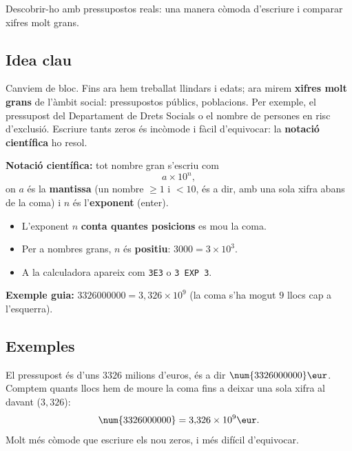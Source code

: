 %
{Descobrir-ho amb pressupostos reals: una manera còmoda d'escriure i comparar xifres molt grans.}

\subsection{Idea clau}

Canviem de bloc. Fins ara hem treballat llindars i edats; ara mirem
\textbf{xifres molt grans} de l'àmbit social: pressupostos públics, poblacions. Per
exemple, el pressupost del Departament de Drets Socials o el nombre de persones en
risc d'exclusió. Escriure tants zeros és incòmode i fàcil d'equivocar: la
\textbf{notació científica} ho resol.

\begin{idea}
\textbf{Notació científica:} tot nombre gran s'escriu com
\[
a\times 10^{n},
\]
on $a$ és la \textbf{mantissa} (un nombre $\ge 1$ i $<10$, és a dir, amb una sola
xifra abans de la coma) i $n$ és l'\textbf{exponent} (enter).
\begin{itemize}[leftmargin=1.4em, itemsep=2pt]
  \item L'exponent $n$ \textbf{conta quantes posicions} es mou la coma.
  \item Per a nombres grans, $n$ és \textbf{positiu}: $\num{3000}=3\times 10^{3}$.
  \item A la calculadora apareix com \texttt{3E3} o \texttt{3\,EXP\,3}.
\end{itemize}
\textbf{Exemple guia:} $\num{3326000000}=3,326\times 10^{9}$ (la coma s'ha mogut $9$
llocs cap a l'esquerra).
\end{idea}

\subsection{Exemples}

\begin{exemple}
El pressupost és d'uns $\num{3326}$ milions d'euros, és a dir
$\num{3326000000}\eur$. Comptem quants llocs hem de moure la coma fins a deixar una
sola xifra al davant ($3,326$):
\[
\num{3326000000} = 3{,}326\times 10^{9}\eur.
\]
Molt més còmode que escriure els nou zeros, i més difícil d'equivocar.
\end{exemple}

